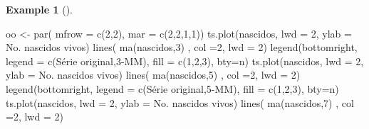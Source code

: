 \documentclass[
  letterpaper,
  DIV=11,
  numbers=noendperiod]{scrartcl}
\newenvironment{Shaded}{\begin{snugshade}}{\end{snugshade}}
\newcommand{\AttributeTok}[1]{\textcolor[rgb]{0.40,0.45,0.13}{#1}}
\newcommand{\DecValTok}[1]{\textcolor[rgb]{0.68,0.00,0.00}{#1}}
\newcommand{\FunctionTok}[1]{\textcolor[rgb]{0.28,0.35,0.67}{#1}}
\newcommand{\NormalTok}[1]{\textcolor[rgb]{0.00,0.23,0.31}{#1}}
\newcommand{\OtherTok}[1]{\textcolor[rgb]{0.00,0.23,0.31}{#1}}
\newcommand{\StringTok}[1]{\textcolor[rgb]{0.13,0.47,0.30}{#1}}
\theoremstyle{definition}
\newtheorem{example}{Example}[chapter]
\theoremstyle{definition}
\theoremstyle{plain}
\theoremstyle{plain}
\theoremstyle{remark}
\begin{document}
\begin{example}[]
\begin{Shaded}
\begin{Highlighting}[]
\NormalTok{oo }\OtherTok{\textless{}{-}} \FunctionTok{par}\NormalTok{( }\AttributeTok{mfrow =} \FunctionTok{c}\NormalTok{(}\DecValTok{2}\NormalTok{,}\DecValTok{2}\NormalTok{), }\AttributeTok{mar =} \FunctionTok{c}\NormalTok{(}\DecValTok{2}\NormalTok{,}\DecValTok{2}\NormalTok{,}\DecValTok{1}\NormalTok{,}\DecValTok{1}\NormalTok{))}
\FunctionTok{ts.plot}\NormalTok{(nascidos, }\AttributeTok{lwd =} \DecValTok{2}\NormalTok{, }\AttributeTok{ylab =} \StringTok{\textquotesingle{}No. nascidos vivos\textquotesingle{}}\NormalTok{)}
\FunctionTok{lines}\NormalTok{( }\FunctionTok{ma}\NormalTok{(nascidos,}\DecValTok{3}\NormalTok{) , }\AttributeTok{col =}\DecValTok{2}\NormalTok{, }\AttributeTok{lwd =} \DecValTok{2}\NormalTok{)}
\FunctionTok{legend}\NormalTok{(}\StringTok{\textquotesingle{}bottomright\textquotesingle{}}\NormalTok{, }\AttributeTok{legend =} \FunctionTok{c}\NormalTok{(}\StringTok{\textquotesingle{}Série original\textquotesingle{}}\NormalTok{,}\StringTok{\textquotesingle{}3{-}MM\textquotesingle{}}\NormalTok{),  }\AttributeTok{fill =} \FunctionTok{c}\NormalTok{(}\DecValTok{1}\NormalTok{,}\DecValTok{2}\NormalTok{,}\DecValTok{3}\NormalTok{), }\AttributeTok{bty=}\StringTok{\textquotesingle{}n\textquotesingle{}}\NormalTok{)}
\FunctionTok{ts.plot}\NormalTok{(nascidos, }\AttributeTok{lwd =} \DecValTok{2}\NormalTok{, }\AttributeTok{ylab =} \StringTok{\textquotesingle{}No. nascidos vivos\textquotesingle{}}\NormalTok{)}
\FunctionTok{lines}\NormalTok{( }\FunctionTok{ma}\NormalTok{(nascidos,}\DecValTok{5}\NormalTok{) , }\AttributeTok{col =}\DecValTok{2}\NormalTok{, }\AttributeTok{lwd =} \DecValTok{2}\NormalTok{)}
\FunctionTok{legend}\NormalTok{(}\StringTok{\textquotesingle{}bottomright\textquotesingle{}}\NormalTok{, }\AttributeTok{legend =} \FunctionTok{c}\NormalTok{(}\StringTok{\textquotesingle{}Série original\textquotesingle{}}\NormalTok{,}\StringTok{\textquotesingle{}5{-}MM\textquotesingle{}}\NormalTok{),  }\AttributeTok{fill =} \FunctionTok{c}\NormalTok{(}\DecValTok{1}\NormalTok{,}\DecValTok{2}\NormalTok{,}\DecValTok{3}\NormalTok{), }\AttributeTok{bty=}\StringTok{\textquotesingle{}n\textquotesingle{}}\NormalTok{)}
\FunctionTok{ts.plot}\NormalTok{(nascidos, }\AttributeTok{lwd =} \DecValTok{2}\NormalTok{, }\AttributeTok{ylab =} \StringTok{\textquotesingle{}No. nascidos vivos\textquotesingle{}}\NormalTok{)}
\FunctionTok{lines}\NormalTok{( }\FunctionTok{ma}\NormalTok{(nascidos,}\DecValTok{7}\NormalTok{) , }\AttributeTok{col =}\DecValTok{2}\NormalTok{, }\AttributeTok{lwd =} \DecValTok{2}\NormalTok{)}

\end{Highlighting}
\end{Shaded}
\end{example}
\end{document}
